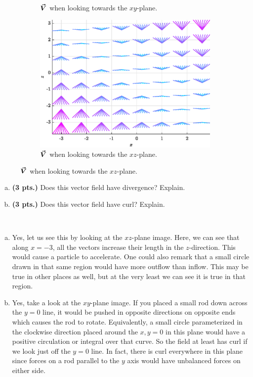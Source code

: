 \documentclass[12pt]{article} %
\begin{document}
\begin{problem}
\begin{figure}[H]
\begin{subfigure}[b]{0.45\textwidth}
			\caption{$\boldsymbol{\vec{V}}$ when looking towards the $xy$-plane.}
		\end{subfigure}
		\quad
		\begin{subfigure}[b]{0.45\textwidth}
			\centering
			\includegraphics[width=\textwidth]{figures/vecfield_xz}
			\caption{$\boldsymbol{\vec{V}}$ when looking towards the $xz$-plane.}
		\end{subfigure}
	\end{figure}
	\begin{enumerate}[(a)]
		\item \textbf{(3 pts.)} Does this vector field have divergence? Explain.
		\item \textbf{(3 pts.)} Does this vector field have curl? Explain.
	\end{enumerate}
\end{problem}
\begin{solution}~
\begin{enumerate}[(a)]
\item Yes, let us see this by looking at the $xz$-plane image. Here, we can see that along $x=-3$, all the vectors increase their length in the $z$-direction. This would cause a particle to accelerate. One could also remark that a small circle drawn in that same region would have more outflow than inflow. This may be true in other places as well, but at the very least we can see it is true in that region.

\item Yes, take a look at the $xy$-plane image. If you placed a small rod down across the $y=0$ line, it would be pushed in opposite directions on opposite ends which causes the rod to rotate. Equivalently, a small circle parameterized in the clockwise direction placed around the $x,y=0$ in this plane would have a positive circulation or integral over that curve. So the field at least has curl if we look just off the $y=0$ line. In fact, there is curl everywhere in this plane since forces on a rod parallel to the $y$ axis would have unbalanced forces on either side.
\end{enumerate}
\end{solution}
\end{document}
